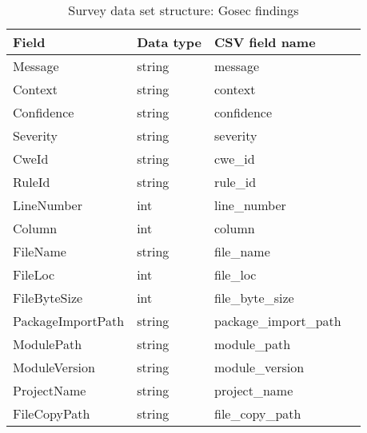         \begin{table}[h]
            \centering
            \caption{Survey data set structure: Gosec findings}
            \label{tbl:datastructure-gosec-findings}
            \begin{tabular}{llll}
                \toprule
                Field & Data type & CSV field name \\
                \midrule
                Message              & string & message \\
                Context              & string & context \\
                Confidence           & string & confidence \\
                Severity             & string & severity \\
                CweId                & string & cwe\_id \\
                RuleId               & string & rule\_id \\
                LineNumber           & int    & line\_number \\
                Column               & int    & column \\
                FileName             & string & file\_name \\
                FileLoc              & int    & file\_loc \\
                FileByteSize         & int    & file\_byte\_size \\
                PackageImportPath    & string & package\_import\_path \\
                ModulePath           & string & module\_path \\
                ModuleVersion        & string & module\_version \\
                ProjectName          & string & project\_name \\
                FileCopyPath         & string & file\_copy\_path \\
                \bottomrule
            \end{tabular}
        \end{table}

